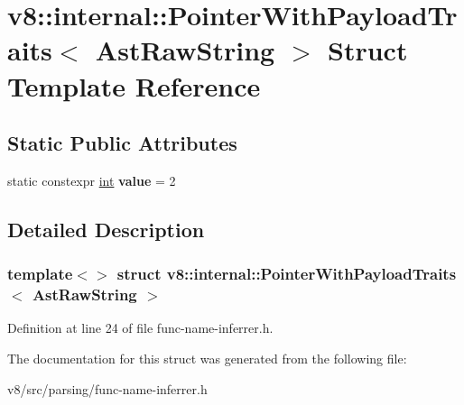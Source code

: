 \hypertarget{structv8_1_1internal_1_1PointerWithPayloadTraits_3_01AstRawString_01_4}{}\section{v8\+:\+:internal\+:\+:Pointer\+With\+Payload\+Traits$<$ Ast\+Raw\+String $>$ Struct Template Reference}
\label{structv8_1_1internal_1_1PointerWithPayloadTraits_3_01AstRawString_01_4}
\subsection*{Static Public Attributes}
\begin{DoxyCompactItemize}
\item 
\mbox{\label{structv8_1_1internal_1_1PointerWithPayloadTraits_3_01AstRawString_01_4_a37f05062318214a833ef157711668f71}} 
static constexpr \mbox{\hyperlink{classint}{int}} {\bfseries value} = 2
\end{DoxyCompactItemize}


\subsection{Detailed Description}
\subsubsection*{template$<$$>$\newline
struct v8\+::internal\+::\+Pointer\+With\+Payload\+Traits$<$ Ast\+Raw\+String $>$}



Definition at line 24 of file func-\/name-\/inferrer.\+h.



The documentation for this struct was generated from the following file\+:\begin{DoxyCompactItemize}
\item 
v8/src/parsing/func-\/name-\/inferrer.\+h\end{DoxyCompactItemize}
